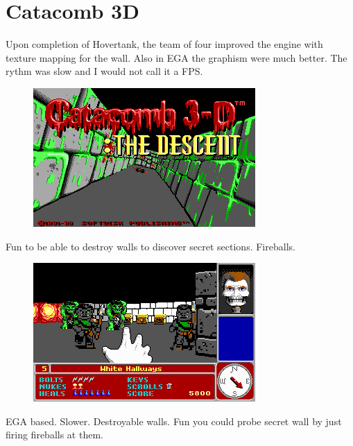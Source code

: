 \section{Catacomb 3D}
Upon completion of Hovertank, the team of four improved the engine with texture mapping for the wall. Also in EGA the graphism were much better. The rythm was slow and I would not call it a FPS. 
\begin{figure}[H]
\centering
\includegraphics[width=\textwidth]{imgs/Catacomb_3-D_The_Descent_title_screen.png}
\end{figure}

Fun to be able to destroy walls to discover secret sections. Fireballs.

\begin{figure}[H]
\centering
\includegraphics[width=\textwidth]{imgs/Catacomb_3-D_The_Descent_screenshot.png}
\end{figure}

EGA based. Slower. Destroyable walls. Fun you could probe secret wall by just firing fireballs at them.



